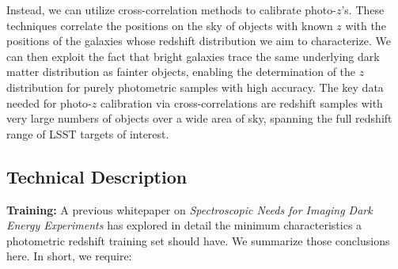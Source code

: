 Instead, we can utilize cross-correlation methods to calibrate photo-$z$'s.  These techniques correlate the positions on the sky of objects with known $z$ with the positions of the galaxies whose redshift distribution we aim to characterize.  We can then exploit the fact that bright galaxies trace the same underlying dark matter distribution as fainter objects, enabling the determination of the $z$ distribution for purely photometric samples with high accuracy.  The key data needed for photo-$z$ calibration via cross-correlations are redshift samples with very large numbers of objects over a wide area of sky, spanning the full redshift range of LSST targets of interest.




\subsection{Technical Description }



\label{sec:photoz_design}

{\bf Training:} A previous whitepaper on {\it Spectroscopic Needs for Imaging Dark Energy Experiments} \citep{Newman15} has explored in detail the minimum characteristics a photometric redshift training set should have.  We summarize those conclusions here.  In short, we require:

